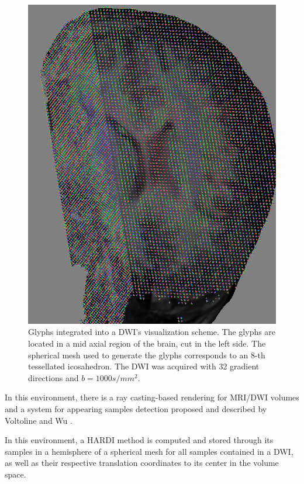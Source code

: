 \documentclass[twoside,twocolumn,10pt]{article}
\begin{document}
\begin{figure}[ht]
    \centering
    \includegraphics[width=1.00\linewidth, angle=0]{figs/Results/glyphs_integrated_DWI.png}
    \caption{Glyphs integrated into a DWI's visualization scheme. The glyphs are located in a mid axial region of the brain, cut in the left side. The spherical mesh used to generate the glyphs corresponds to an 8-th tessellated icosahedron. The DWI was acquired with 32 gradient directions and $b=1000s/mm^2$.
    }
    \label{fig::ex_glyph_DWI_visualization}
\end{figure}

In this environment, there is a ray casting-based rendering for MRI/DWI volumes and a system for appearing samples detection proposed and described by Voltoline and Wu \cite{voltoline2021}. 

In this environment, a HARDI method is computed and stored through its samples in a hemisphere of a spherical mesh for all samples contained in a DWI, as well as their respective translation coordinates to its center in the volume space.
\end{document}
